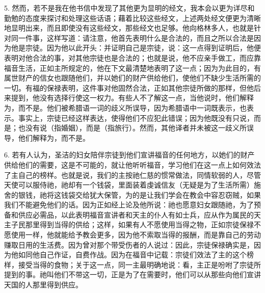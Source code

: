 5. 然而，若不是我在他书信中发现了其他更为显明的经文，我本会以更为详尽和勤勉的态度来探讨和处理这些话语；藉着比较这些经文，上述两处经文便更为清晰地显明出来，而且即使没有这些经文，那些经文也足够。他向格林多人，也就是针对同一件事，这样写道：请注意，他首先表明什么是合法的，而且之所以合法是因为他是宗徒。因为他以此开头：并证明自己是宗徒，说：这一点得到证明后，他便表明对他合法的事，对其他宗徒也是合法的；也就是说，他不应亲手做工，而应靠福音生活，正如主所规定的，他在下文最清楚地表明了这一点；因为为此目的，有属世财产的信女也跟随他们，并以她们的财产供给他们，使他们不缺少生活所需的一切。有福的保禄表明，这件事对他固然合法，正如其他宗徒所做的那样，但他后来提到，他没有选择行使这一权力。有些人不了解这一点，当他说时，他们解释为，而不是。他们被希腊语一词的歧义所误导，因为希腊语中一词既表示，也表示。事实上，宗徒已经这样表达，使得他们不应犯此错误；因为他既没有只说，而是；也没有说（指婚姻），而是（指旅行）。然而，其他译者并未被这一歧义所误导，他们解释为，而不是。\par

6. 若有人认为，圣洁的妇女陪伴宗徒到他们宣讲福音的任何地方，以她们的财产供给他们的需要，这是不可能的，就让他听听福音，学习他们在这一点上如何效法了主自己的榜样。也就是说，我们的主按祂仁慈的惯常做法，同情软弱的人，尽管天使可以服侍祂，祂却有一个钱袋，里面装着虔诚信友（无疑是为了生活所需）施舍的银钱，祂将这钱袋交给犹大保管，为的是让我们学会在教会中容忍窃贼，如果我们不能避免他们的话。因为正如经上论及他所说：祂也愿意妇女跟随祂，为了预备和供应必需品，以此表明福音宣讲者和天主的仆人有如士兵，应从作为属民的天主子民那里得到当得的供给；这样，如果有人不愿使用当得之物，正如宗徒保禄不愿使用一样，他就能给予教会更多，因为他不索取当得的报酬，而是靠自己的劳动赚取日用的生活费。因为曾对那个带受伤者的人说过：因此，宗徒保禄确实是，因为他如同他自己作证，自费作战。因为在福音中记载：宗徒们效法了主的这个榜样，接受当得的食物；关于这一点，同一主最明确地说：看，主正是吩咐了宗徒所提到的事。祂叫他们不带这一切，正是为了在需要时，他们可以从那些向他们宣讲天国的人那里得到供应。\par

